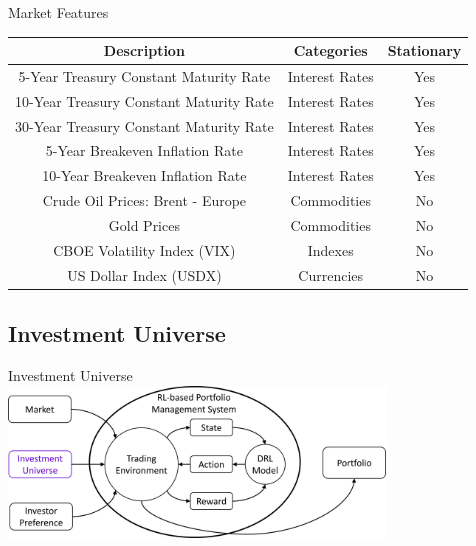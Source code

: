 \begin{frame}{Market Features}
\footnotesize
\begin{tabular}{|| c| c | c||}
\hline
Description & Categories & Stationary \\ \hline \hline
5-Year Treasury Constant Maturity Rate & Interest Rates  & Yes \\ \hline
10-Year Treasury Constant Maturity Rate & Interest Rates & Yes \\ \hline
30-Year Treasury Constant Maturity Rate & Interest Rates & Yes \\ \hline
5-Year Breakeven Inflation Rate & Interest Rates & Yes \\ \hline
10-Year Breakeven Inflation Rate & Interest Rates & Yes \\ \hline
Crude Oil Prices: Brent - Europe &  Commodities & No \\ \hline
Gold Prices &  Commodities & No \\ \hline
CBOE Volatility Index (VIX) &  Indexes & No \\ \hline
US Dollar Index (USDX) &  Currencies & No \\ \hline
\end{tabular}
\end{frame}



\newcommand\mynum[1]{{\renewcommand{\insertenumlabel}{#1}%
      \usebeamertemplate{enumerate item}}}



\subsection{Investment Universe}
\begin{frame}{Investment Universe}
\centering
\includegraphics[width=10cm]{images/investment_universe.png}
\end{frame}

